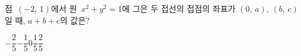 점~$(-2,\,1)$에서 원~$x^2+y^2=1$에 그은 두 접선의 접점의 좌표가 $(0,\,a)$, $(b,\,c)$일 때, $a+b+c$의 값은?
\begin{choices32}{$-\dfrac{2}{5}$}{$-\dfrac{1}{5}$}{$0$}{$\dfrac{1}{5}$}{$\dfrac{2}{5}$}\end{choices32}
